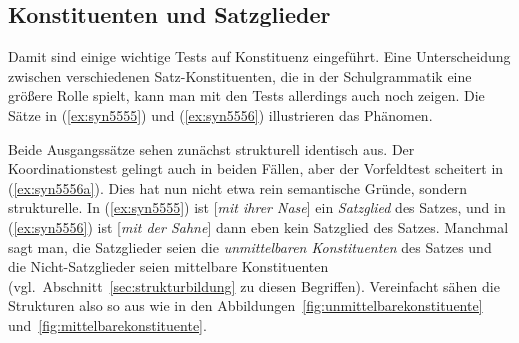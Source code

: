 \subsection{Konstituenten und Satzglieder}

\label{sec:satzglied}

Damit sind einige wichtige Tests auf Konstituenz eingeführt.
Eine Unterscheidung zwischen verschiedenen Satz-Konstituenten, die in der Schulgrammatik eine größere Rolle spielt, kann man mit den Tests allerdings auch noch zeigen.
Die Sätze in (\ref{ex:syn5555}) und (\ref{ex:syn5556}) illustrieren das Phänomen.

\begin{sloppypar}
\begin{exe}
  \ex\label{ex:syn5555}
  \begin{xlist}
  \end{xlist}
  \ex\label{ex:syn5556}
  \begin{xlist}
  \end{xlist}
\end{exe}
\end{sloppypar}

Beide Ausgangssätze sehen zunächst strukturell identisch aus.
Der Koordinationstest gelingt auch in beiden Fällen, aber der Vorfeldtest scheitert in (\ref{ex:syn5556a}).
Dies hat nun nicht etwa rein semantische Gründe, sondern strukturelle.
In (\ref{ex:syn5555}) ist [\textit{mit ihrer Nase}] ein \textit{Satzglied} des Satzes, und in (\ref{ex:syn5556}) ist [\textit{mit der Sahne}] dann eben kein Satzglied des Satzes.
Manchmal sagt man, die Satzglieder seien die \textit{unmittelbaren Konstituenten} des Satzes und die Nicht-Satzglieder seien mittelbare Konstituenten (vgl.\ Abschnitt~\ref{sec:strukturbildung} zu diesen Begriffen).
Vereinfacht sähen die Strukturen also so aus wie in den Abbildungen~\ref{fig:unmittelbarekonstituente} und~\ref{fig:mittelbarekonstituente}.

